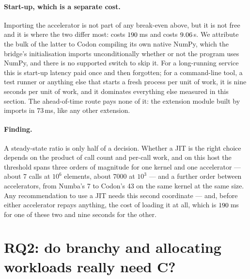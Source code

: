 \paragraph{Start-up, which is a separate cost.} Importing the accelerator is not part of any
break-even above, but it is not free and it is where the two differ most: 
costs $\meas{fact:b1_breakeven-314:facts.numba_import_s:ms}{190}$\,ms and  costs $\meas{fact:b1_breakeven-314:facts.codon_cost_s.import_s}{9.06}$\,s. We attribute the bulk of the latter to
Codon compiling its own native NumPy, which the bridge's initialisation imports unconditionally
whether or not the program uses NumPy, and there is no supported switch to skip it. For a
long-running service this is start-up latency paid once and then forgotten; for a
command-line tool, a test runner or anything else that starts a fresh process per unit of
work, it is nine seconds per unit of work, and it dominates everything else measured in this
section. The ahead-of-time route pays none of it: the extension module built by  imports in $73$\,ms, like any other extension.

\paragraph{Finding.} A steady-state ratio is only half of a decision. Whether a JIT is the
right choice depends on the product of call count and per-call work, and on this host the
threshold spans three orders of magnitude for one kernel and one accelerator --- about 7 calls
at $10^6$ elements, about 7000 at $10^3$ --- and a further order between accelerators, from
Numba's 7 to Codon's 43 on the same kernel at the same size. Any recommendation to use a JIT
needs this second coordinate --- and, before either accelerator repays anything, the cost of
loading it at all, which is $\meas{fact:b1_breakeven-314:facts.numba_import_s:ms}{190}$\,ms for one of these two and nine seconds for the other.

\section{RQ2: do branchy and allocating workloads really need C?}
\label{sec:rq2}


